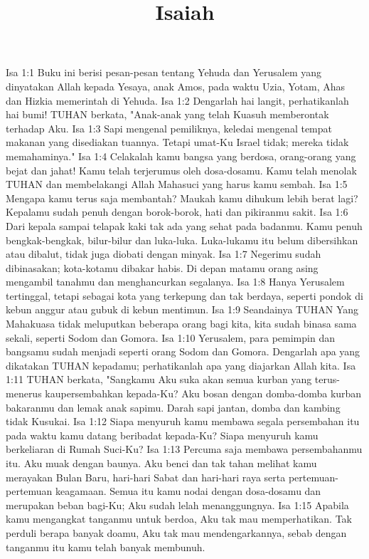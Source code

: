 

\title{Isaiah}

Isa 1:1  Buku ini berisi pesan-pesan tentang Yehuda dan Yerusalem yang dinyatakan Allah kepada Yesaya, anak Amos, pada waktu Uzia, Yotam, Ahas dan Hizkia memerintah di Yehuda.
Isa 1:2  Dengarlah hai langit, perhatikanlah hai bumi! TUHAN berkata, "Anak-anak yang telah Kuasuh memberontak terhadap Aku.
Isa 1:3  Sapi mengenal pemiliknya, keledai mengenal tempat makanan yang disediakan tuannya. Tetapi umat-Ku Israel tidak; mereka tidak memahaminya."
Isa 1:4  Celakalah kamu bangsa yang berdosa, orang-orang yang bejat dan jahat! Kamu telah terjerumus oleh dosa-dosamu. Kamu telah menolak TUHAN dan membelakangi Allah Mahasuci yang harus kamu sembah.
Isa 1:5  Mengapa kamu terus saja membantah? Maukah kamu dihukum lebih berat lagi? Kepalamu sudah penuh dengan borok-borok, hati dan pikiranmu sakit.
Isa 1:6  Dari kepala sampai telapak kaki tak ada yang sehat pada badanmu. Kamu penuh bengkak-bengkak, bilur-bilur dan luka-luka. Luka-lukamu itu belum dibersihkan atau dibalut, tidak juga diobati dengan minyak.
Isa 1:7  Negerimu sudah dibinasakan; kota-kotamu dibakar habis. Di depan matamu orang asing mengambil tanahmu dan menghancurkan segalanya.
Isa 1:8  Hanya Yerusalem tertinggal, tetapi sebagai kota yang terkepung dan tak berdaya, seperti pondok di kebun anggur atau gubuk di kebun mentimun.
Isa 1:9  Seandainya TUHAN Yang Mahakuasa tidak meluputkan beberapa orang bagi kita, kita sudah binasa sama sekali, seperti Sodom dan Gomora.
Isa 1:10  Yerusalem, para pemimpin dan bangsamu sudah menjadi seperti orang Sodom dan Gomora. Dengarlah apa yang dikatakan TUHAN kepadamu; perhatikanlah apa yang diajarkan Allah kita.
Isa 1:11  TUHAN berkata, "Sangkamu Aku suka akan semua kurban yang terus-menerus kaupersembahkan kepada-Ku? Aku bosan dengan domba-domba kurban bakaranmu dan lemak anak sapimu. Darah sapi jantan, domba dan kambing tidak Kusukai.
Isa 1:12  Siapa menyuruh kamu membawa segala persembahan itu pada waktu kamu datang beribadat kepada-Ku? Siapa menyuruh kamu berkeliaran di Rumah Suci-Ku?
Isa 1:13  Percuma saja membawa persembahanmu itu. Aku muak dengan baunya. Aku benci dan tak tahan melihat kamu merayakan Bulan Baru, hari-hari Sabat dan hari-hari raya serta pertemuan-pertemuan keagamaan. Semua itu kamu nodai dengan dosa-dosamu dan merupakan beban bagi-Ku; Aku sudah lelah menanggungnya.
Isa 1:15  Apabila kamu mengangkat tanganmu untuk berdoa, Aku tak mau memperhatikan. Tak perduli berapa banyak doamu, Aku tak mau mendengarkannya, sebab dengan tanganmu itu kamu telah banyak membunuh.
